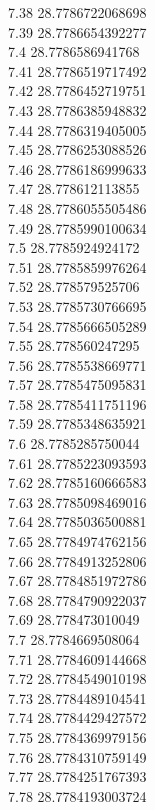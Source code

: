 {7.38	28.7786722068698\\
7.39	28.7786654392277\\
7.4	28.7786586941768\\
7.41	28.7786519717492\\
7.42	28.7786452719751\\
7.43	28.7786385948832\\
7.44	28.7786319405005\\
7.45	28.7786253088526\\
7.46	28.7786186999633\\
7.47	28.778612113855\\
7.48	28.7786055505486\\
7.49	28.7785990100634\\
7.5	28.7785924924172\\
7.51	28.7785859976264\\
7.52	28.778579525706\\
7.53	28.7785730766695\\
7.54	28.7785666505289\\
7.55	28.778560247295\\
7.56	28.7785538669771\\
7.57	28.7785475095831\\
7.58	28.7785411751196\\
7.59	28.7785348635921\\
7.6	28.7785285750044\\
7.61	28.7785223093593\\
7.62	28.7785160666583\\
7.63	28.7785098469016\\
7.64	28.7785036500881\\
7.65	28.7784974762156\\
7.66	28.7784913252806\\
7.67	28.7784851972786\\
7.68	28.7784790922037\\
7.69	28.778473010049\\
7.7	28.7784669508064\\
7.71	28.7784609144668\\
7.72	28.7784549010198\\
7.73	28.7784489104541\\
7.74	28.7784429427572\\
7.75	28.7784369979156\\
7.76	28.7784310759149\\
7.77	28.7784251767393\\
7.78	28.7784193003724\\
}
